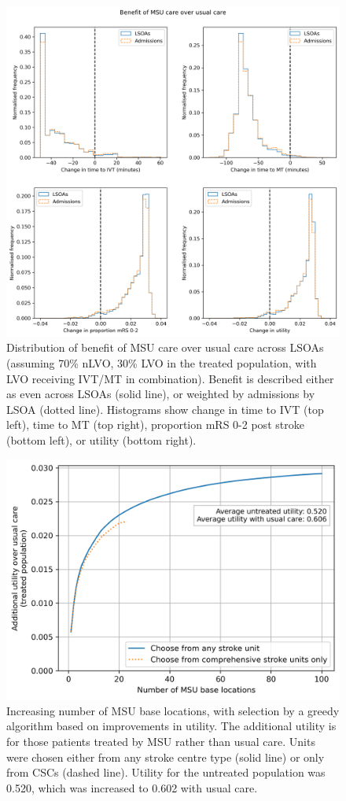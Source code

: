 \begin{figure}[h]
    \centering
    \includegraphics[width=0.75\linewidth]{images/histograms.png}
    \caption{Distribution of benefit of MSU care over usual care across LSOAs (assuming 70\% nLVO, 30\% LVO in the treated population, with LVO receiving IVT/MT in combination). Benefit is described either as even across LSOAs (solid line), or weighted by admissions by LSOA (dotted line). Histograms show change in time to IVT (top left), time to MT (top right), proportion mRS 0-2 post stroke (bottom left), or utility (bottom right).}
    \label{fig:msu_histograms}
\end{figure}

\begin{figure}[h]
    \centering
    \includegraphics[width=0.5\linewidth]{images/msu_advantages_greedy.png}
    \caption{Increasing number of MSU base locations, with selection by a greedy algorithm based on improvements in utility. The additional utility is for those patients treated by MSU rather than usual care. Units were chosen either from any stroke centre type (solid line) or only from CSCs (dashed line). Utility for the untreated population was 0.520, which was increased to 0.602 with usual care.}
    \label{fig:greedy}
\end{figure}